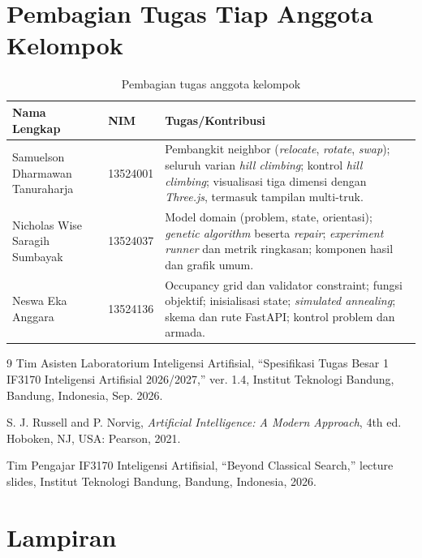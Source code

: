 \documentclass[12pt,a4paper]{article}
\begin{document}
\pagebreak
\section{Pembagian Tugas Tiap Anggota Kelompok}
\begin{table}[ht]
    \centering
    \renewcommand{\arraystretch}{1.5}
    \begin{tabularx}{\textwidth}{@{}p{7cm}lX@{}}
        \toprule
        \textbf{Nama Lengkap} & \textbf{NIM} & \textbf{Tugas/Kontribusi} \\
        \midrule
        Samuelson Dharmawan Tanuraharja & 13524001 & Pembangkit neighbor (\textit{relocate}, \textit{rotate}, \textit{swap}); seluruh varian \textit{hill climbing}; kontrol \textit{hill climbing}; visualisasi tiga dimensi dengan \textit{Three.js}, termasuk tampilan multi-truk. \\
        Nicholas Wise Saragih Sumbayak & 13524037 & Model domain (problem, state, orientasi); \textit{genetic algorithm} beserta \textit{repair}; \textit{experiment runner} dan metrik ringkasan; komponen hasil dan grafik umum. \\
        Neswa Eka Anggara & 13524136 & Occupancy grid dan validator constraint; fungsi objektif; inisialisasi state; \textit{simulated annealing}; skema dan rute FastAPI; kontrol problem dan armada. \\
        \bottomrule
    \end{tabularx}
    \caption{Pembagian tugas anggota kelompok}
\end{table}

\renewcommand{\refname}{Daftar Pustaka}
\begin{thebibliography}{9}
Tim Asisten Laboratorium Inteligensi Artifisial, ``Spesifikasi Tugas Besar 1 IF3170 Inteligensi Artifisial 2026/2027,'' ver. 1.4, Institut Teknologi Bandung, Bandung, Indonesia, Sep. 2026.

S. J. Russell and P. Norvig, \emph{Artificial Intelligence: A Modern Approach}, 4th ed. Hoboken, NJ, USA: Pearson, 2021.

Tim Pengajar IF3170 Inteligensi Artifisial, ``Beyond Classical Search,'' lecture slides, Institut Teknologi Bandung, Bandung, Indonesia, 2026.
\end{thebibliography}

\clearpage
\section{Lampiran}
\end{document}
